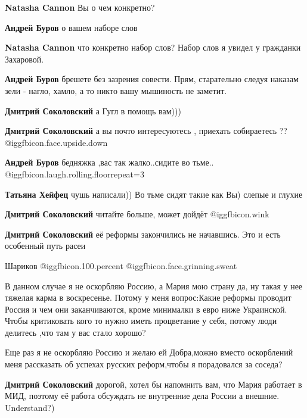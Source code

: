 \begin{itemize}
\begin{itemize}
\textbf{Natasha Cannon} Вы о чем конкретно?

\textbf{Андрей Буров} о вашем наборе слов

\textbf{Natasha Cannon} что конкретно набор слов? Набор слов я увидел у гражданки Захаровой.

\textbf{Андрей Буров} брешете без зазрения совести. Прям, старательно следуя наказам зели - нагло, хамло, а то никто вашу мышиность не заметит.

\textbf{Дмитрий Соколовский} а Гугл в помощь вам)))

\textbf{Дмитрий Соколовский} а вы почто интересуютесь , приехать собираетесь ?? @igg{fbicon.face.upside.down} 

\textbf{Андрей Буров} бедняжка ,вас так жалко..сидите во тьме.. @igg{fbicon.laugh.rolling.floor}{repeat=3} 

\textbf{Татьяна Хейфец} чушь написали)) Во тьме сидят такие как Вы) слепые и глухие

\textbf{Дмитрий Соколовский} читайте больше, может дойдёт  @igg{fbicon.wink} 

\textbf{Дмитрий Соколовский} её реформы закончились не начавшись. Это и есть особенный путь расеи


\end{itemize} %

Шариков  @igg{fbicon.100.percent}  @igg{fbicon.face.grinning.sweat} 


В данном случае я не оскорбляю Россию, а Мария мою страну да, ну такая у нее
тяжелая карма в воскресенье. Потому у меня вопрос:Какие реформы проводит Россия
и чем они заканчиваются, кроме минималки в евро ниже Украинской. Чтобы
критиковать кого то нужно иметь процветание у себя, потому люди делитесь ,что
там у вас стало хорошо?

\begin{itemize} %
Еще раз я не оскорбляю Россию и желаю ей Добра,можно вместо оскорблений меня рассказать об успехах русских реформ,чтобы я порадовался за соседа?

\textbf{Дмитрий Соколовский} дорогой, хотел бы напомнить вам, что Мария работает в МИД, поэтому её работа обсуждать не внутренние дела России а внешние. Understand?)


\end{itemize}
\end{itemize}
